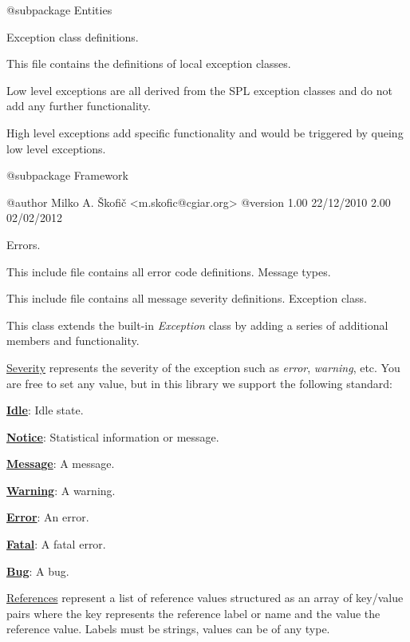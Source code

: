 \begin{DoxyVerb} @subpackage        Entities\end{DoxyVerb}


Exception class definitions.

This file contains the definitions of local exception classes.

Low level exceptions are all derived from the S\-P\-L exception classes and do not add any further functionality.

High level exceptions add specific functionality and would be triggered by queing low level exceptions.

\begin{DoxyVerb} @subpackage        Framework

 @author            Milko A. Škofič <m.skofic@cgiar.org>
 @version   1.00 22/12/2010
                    2.00 02/02/2012\end{DoxyVerb}


Errors.

This include file contains all error code definitions. Message types.

This include file contains all message severity definitions. Exception class.

This class extends the built-\/in {\itshape Exception} class by adding a series of additional members and functionality.

\hyperlink{}{Severity} represents the severity of the exception such as {\itshape error}, {\itshape warning}, etc. You are free to set any value, but in this library we support the following standard\-: 
\begin{DoxyItemize}
\item {\bfseries \hyperlink{}{Idle}}\-: Idle state. 
\item {\bfseries \hyperlink{}{Notice}}\-: Statistical information or message. 
\item {\bfseries \hyperlink{}{Message}}\-: A message. 
\item {\bfseries \hyperlink{}{Warning}}\-: A warning. 
\item {\bfseries \hyperlink{}{Error}}\-: An error. 
\item {\bfseries \hyperlink{}{Fatal}}\-: A fatal error. 
\item {\bfseries \hyperlink{}{Bug}}\-: A bug. 
\end{DoxyItemize}

\hyperlink{}{References} represent a list of reference values structured as an array of key/value pairs where the key represents the reference label or name and the value the reference value. Labels must be strings, values can be of any type.

